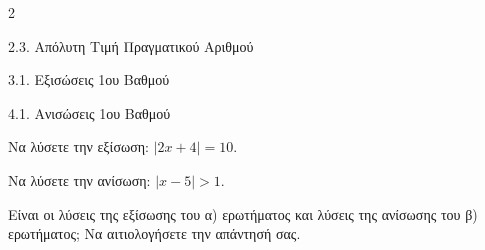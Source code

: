 \begin{ylh}{2}
    \item 2.3. Απόλυτη Τιμή Πραγματικού Αριθμού
    \item 3.1. Εξισώσεις 1ου Βαθμού
    \item 4.1. Ανισώσεις 1ου Βαθμού
\end{ylh}

\begin{alist}
\item Να λύσετε την εξίσωση: $|2x + 4| = 10$.
\item Nα λύσετε την ανίσωση: $|x - 5| > 1$.
\item Είναι οι λύσεις της εξίσωσης του α) ερωτήματος και λύσεις της ανίσωσης του β) ερωτήματος; Να αιτιολογήσετε την απάντησή σας.
\end{alist}

